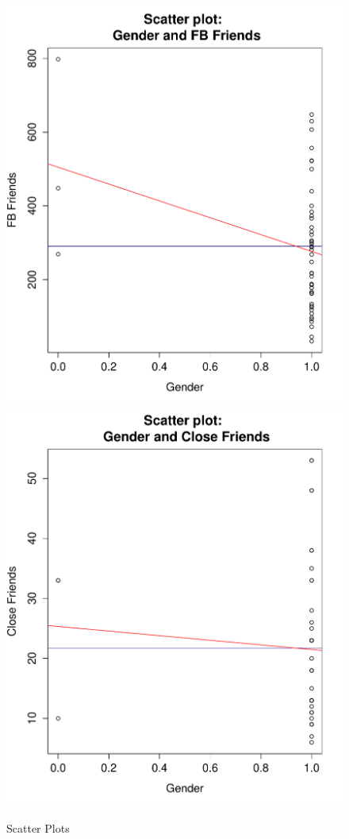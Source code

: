 \begin{figure}[H]
\caption{Scatter Plots}
\centering
\includegraphics[scale=0.44]{./img/scatplot_fbfriends.pdf}
\includegraphics[scale=0.44]{./img/scatplot_closefriends.pdf}

\end{figure}
